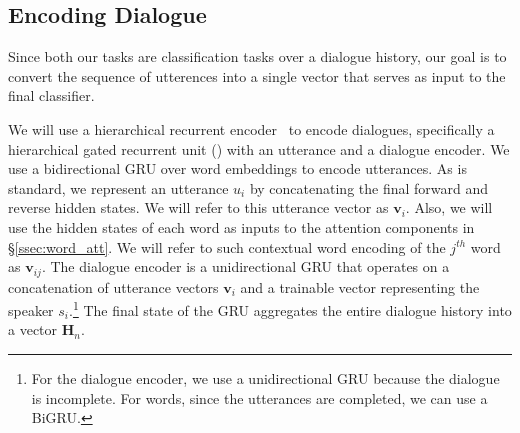 \subsection{Encoding Dialogue}
\label{ssec:dialog_rep}




Since both our tasks are classification tasks over a dialogue
history, our goal is to convert the sequence of utterences into a
single vector that serves as input to the final classifier.

We will use a hierarchical recurrent encoder~\cite[and
others]{li2015hierarchical,sordoni2015hierarchical,serban2016building}
to encode dialogues, specifically a hierarchical gated recurrent
unit (\HGRU) with an utterance and a dialogue encoder. We use a
bidirectional GRU over word embeddings to encode utterances. As is
standard, we represent an utterance $u_i$ by concatenating the final
forward and reverse hidden states. We will refer to this utterance
vector as $\bm{v}_i$. Also, we will use the hidden states of
each word as inputs to the attention components in
\S\ref{ssec:word_att}. We will refer to such contextual word
encoding of the $j^{th}$ word as $\bm{v}_{ij}$. The dialogue encoder
is a unidirectional GRU that operates on a concatenation of
utterance vectors $\bm{v}_i$ and a trainable vector representing the
speaker $s_i$.\footnote{For the dialogue encoder, we use a
  unidirectional GRU because the dialogue is incomplete. For words,
  since the utterances are completed, we can use a BiGRU.} The final
state of the GRU aggregates the entire dialogue history into a
vector $\bm{H}_n$.



